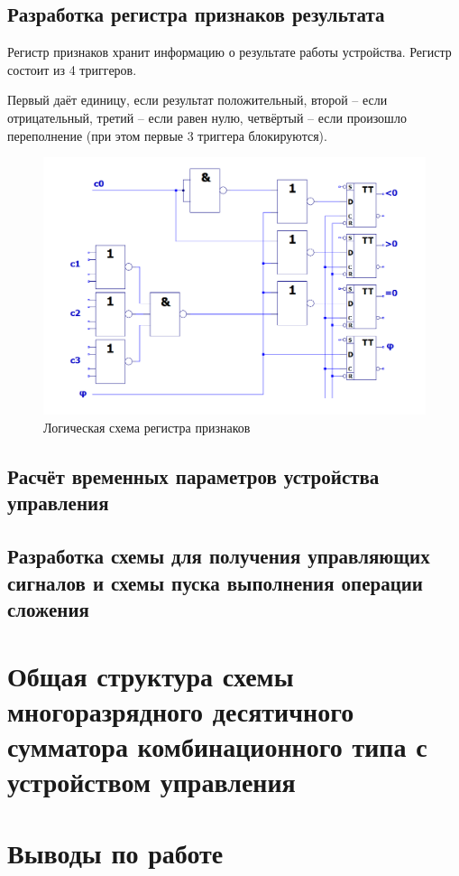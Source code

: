 \documentclass[a4paper,14pt]{article}
\begin{document}
\subsection{Разработка регистра признаков результата}

Регистр признаков хранит информацию о результате работы устройства.
Регистр состоит из 4 триггеров.

Первый даёт единицу, если результат положительный, второй -- если отрицательный, третий -- если равен нулю, четвёртый -- если произошло переполнение (при этом первые 3 триггера блокируются).

\begin{figure}[H]
	\centering
	\includegraphics[width=\linewidth]{schemas/prop}
	\caption{Логическая схема регистра признаков}
	\label{fig:prop}
\end{figure}
\subsection{Расчёт временных параметров устройства управления}

\subsection{Разработка схемы для получения управляющих сигналов и схемы пуска выполнения операции сложения}

\section{Общая структура схемы многоразрядного десятичного сумматора комбинационного типа с устройством управления}

\section{Выводы по работе}
\end{document}
